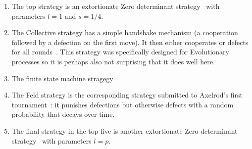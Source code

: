 \documentclass{article}
\begin{document}
\begin{enumerate}
    \item The top strategy is an extortionate Zero determinant
        strategy~\cite{Press2012} with parameters \(l=1\) and \(s=1/4\).
    \item The Collective strategy has a simple handshake mechanism (a
        cooperation followed by a defection on the first move). It then either
        cooperates or defects for all rounds~\cite{Li2009}.  This strategy was
        specifically designed for Evolutionary processes so it is perhaps also
        not surprising that it does well here.
    \item The finite state machine stragegy %
    \item The Feld strategy is the corresponding strategy submitted to Axelrod's
        first tournament~\cite{Axelrod1980a}: it punishes defections but
        otherwise defects with a random probability that decays over time.
    \item The final strategy in the top five is another extortionate Zero
        determinant strategy~\cite{Press2012} with parameters \(l=p\).
\end{enumerate}
\end{document}

